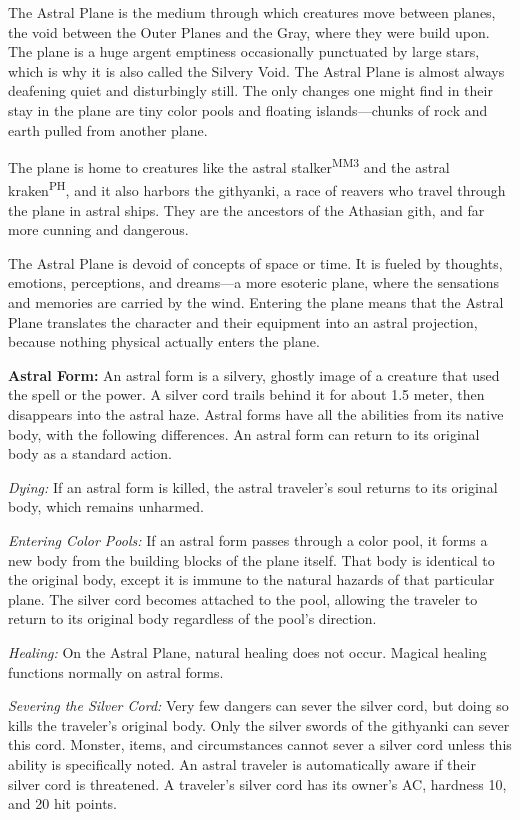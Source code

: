 The Astral Plane is the medium through which creatures move between planes, the void between the Outer Planes and the Gray, where they were build upon. The plane is a huge argent emptiness occasionally punctuated by large stars, which is why it is also called the Silvery Void. The Astral Plane is almost always deafening quiet and disturbingly still. The only changes one might find in their stay in the plane are tiny color pools and floating islands---chunks of rock and earth pulled from another plane.

The plane is home to creatures like the astral stalker\textsuperscript{MM3} and the astral kraken\textsuperscript{PH}, and it also harbors the githyanki, a race of reavers who travel through the plane in astral ships. They are the ancestors of the Athasian gith, and far more cunning and dangerous.

The Astral Plane is devoid of concepts of space or time. It is fueled by thoughts, emotions, perceptions, and dreams---a more esoteric plane, where the sensations and memories are carried by the wind. Entering the plane means that the Astral Plane translates the character and their equipment into an astral projection, because nothing physical actually enters the plane.

\textbf{Astral Form:} An astral form is a silvery, ghostly image of a creature that used the  spell or the  power. A silver cord trails behind it for about 1.5 meter, then disappears into the astral haze. Astral forms have all the abilities from its native body, with the following differences. An astral form can return to its original body as a standard action.

\textit{Dying:} If an astral form is killed, the astral traveler's soul returns to its original body, which remains unharmed.

\textit{Entering Color Pools:} If an astral form passes through a color pool, it forms a new body from the building blocks of the plane itself. That body is identical to the original body, except it is immune to the natural hazards of that particular plane. The silver cord becomes attached to the pool, allowing the traveler to return to its original body regardless of the pool's direction.

\textit{Healing:} On the Astral Plane, natural healing does not occur. Magical healing functions normally on astral forms.

\textit{Severing the Silver Cord:} Very few dangers can sever the silver cord, but doing so kills the traveler's original body. Only the silver swords of the githyanki can sever this cord. Monster, items, and circumstances cannot sever a silver cord unless this ability is specifically noted. An astral traveler is automatically aware if their silver cord is threatened. A traveler's silver cord has its owner's AC, hardness 10, and 20 hit points.

